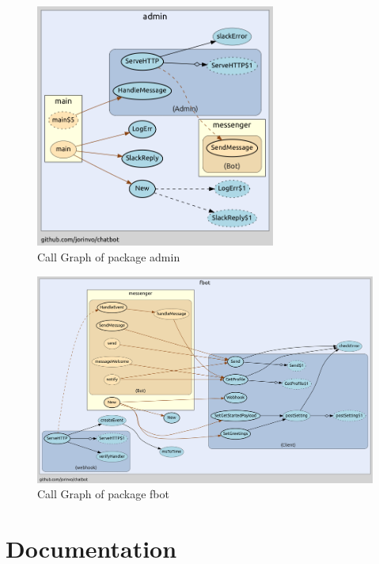 \begin{figure}[H]
  \centering
  \includegraphics[height=8cm]{images/call-graph-admin.png}
	\caption{Call Graph of package admin}
\end{figure}

\begin{figure}[H]
  \centering
  \includegraphics[width=\textwidth]{images/call-graph-fbot.png}
	\caption{Call Graph of package fbot}
\end{figure}

\section{Documentation}
\label{a:docs}

